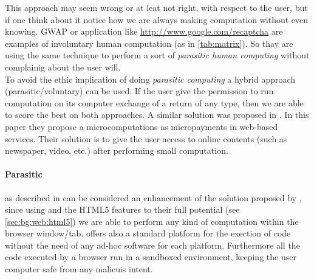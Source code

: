 This approach may seem wrong or at leat not right, with respect to the user, but
if one think about it notice how we are always making computation without even
knowing. \ac{GWAP} or application like \href{reCAPTCHA}{http://www.google.com/recaptcha}
are examples of involuntary human computation (as in \autoref{tab:matrix}). So
thay are using the same technique to perform a sort of \emph{parasitic human
computing} without complainig about the user will.\\

To avoid the ethic implication of doing \emph{parasitic computing} a hybrid
approach (parasitic/voluntary) can be used. If the user give the permission to
run computation on its computer exchange of a return of any type, then we are
able to score the best on both approaches. A similar solution was proposed in
\cite{karame2011pay}.
In this paper they propose a microcomputations as micropayments in web-based
services. Their solution is to give the user access to online contents (such as
newspaper, video, etc.) after performing small \js{} computation.

\paragraph{Parasitic \js{}} as described in \cite{jenkin2008parasitic} can be
considered an enhancement of the solution proposed by \cite{barabasi2001parasitic},
since using \js{} and the HTML5 features to their full potential (see
\ref{sec:bg:web:html5}) we are able to perform any kind of computation
within the browser window/tab. \js{} offers also a standard platform for the
exection of code without the need of any ad-hoc software for each platform.
Furthermore all the code executed by a browser run in a sandboxed environment,
keeping the user computer safe from any malicuis intent.